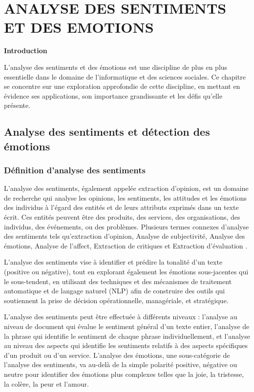 \newpage
\chapter{ANALYSE DES SENTIMENTS ET DES EMOTIONS}


\vspace{15mm}


\textbf{Introduction}\par
L'analyse des sentiments et des émotions est une discipline de plus en plus essentielle dans le domaine de l'informatique et des sciences sociales. Ce chapitre se concentre sur une exploration approfondie de cette discipline, en mettant en évidence ses applications, son importance grandissante et les défis qu'elle présente.
\section{Analyse des sentiments et détection des émotions}
\subsection{Définition d'analyse des sentiments}
L’analyse des sentiments, également appelée extraction d'opinion, est un domaine de recherche qui analyse les opinions, les sentiments, les attitudes et les émotions des individus à l’égard des entités et de leurs attributs exprimés dans un texte écrit. Ces entités peuvent être des produits, des services, des organisations, des individus, des événements, ou des problèmes. Plusieurs termes connexes d’analyse des sentiments tels qu’extraction d'opinion, Analyse de subjectivité, Analyse des émotions, Analyse de l'affect, Extraction de critiques et Extraction d'évaluation \cite{liu2015mining}. \par
L'analyse des sentiments vise à identifier et prédire la tonalité d'un texte (positive ou négative), tout en explorant également les émotions sous-jacentes qui le sous-tendent, en utilisant des techniques et des mécanismes de traitement automatique et de langage naturel (NLP) afin de construire des outils qui soutiennent la prise de décision opérationnelle, managériale, et stratégique. \par
L’analyse des sentiments peut être effectuée à différents niveaux : l’analyse au niveau de document qui évalue le sentiment général d’un texte entier, l’analyse de la phrase qui identifie le sentiment de chaque phrase individuellement, et l’analyse au niveau des aspects qui identifie les sentiments relatifs à des aspects spécifiques d’un produit ou d’un service.
L’analyse des émotions, une sous-catégorie de l’analyse des sentiments, va au-delà de la simple polarité positive, négative ou neutre pour identifier des émotions plus complexes telles que la joie, la tristesse, la colère, la peur et l’amour.     

